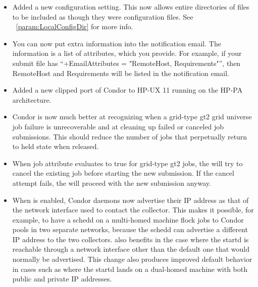 \begin{itemize}


\item Added a new  configuration setting. 
This now allows entire directories of files to be included as though they
were configuration files. 
See ~\ref{param:LocalConfigDir} for more info.

\item You can now put extra information into the notification
email. The information is a list of attributes, which you provide. For
example, if your submit file has ``+EmailAttributes = "RemoteHost,
Requirements"'', then RemoteHost and Requirements will be listed in
the notification email. 

\item Added a new clipped port of Condor to HP-UX 11 running on 
the HP-PA architecture.


\item Condor is now much better at recognizing when a grid-type gt2 grid
universe job failure is unrecoverable and at cleaning up failed or canceled
job submissions. This should reduce the number of jobs
that perpetually return to held state when released.

\item When job attribute  evaluates to true for
grid-type gt2 jobs, the
 will try to cancel the existing job before starting
the new submission. If the cancel attempt fails, the 
will proceed with the new submission anyway.

\item When  is enabled, Condor daemons
now advertise their IP address as that of the network interface used
to contact the collector.  This makes it possible, for example, to
have a schedd on a multi-homed machine flock jobs to Condor pools in
two separate networks, because the schedd can advertise a different IP
address to the two collectors.   also benefits in the case
where the startd is reachable through a network interface other than
the default one that would normally be advertised.  This change also
produces improved default behavior in cases such as 
where the startd lands on a dual-homed machine with both public
and private IP addresses.


\end{itemize}
